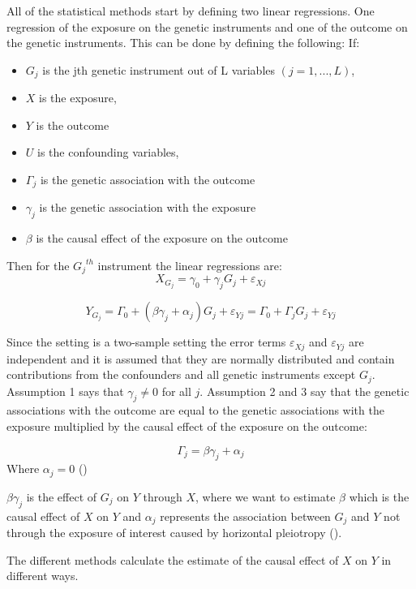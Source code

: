 \documentclass[
]{article}
\providecommand{\tightlist}{%
  \setlength{\itemsep}{0pt}\setlength{\parskip}{0pt}}
\begin{document}
All of the statistical methods start by defining two linear regressions.
One regression of the exposure on the genetic instruments and one of the
outcome on the genetic instruments. This can be done by defining the
following: If:

\begin{itemize}
\tightlist
\item
  \(G_j\) is the jth genetic instrument out of L variables
  \((j=1,...,L)\),
\item
  \(X\) is the exposure,
\item
  \(Y\) is the outcome
\item
  \(U\) is the confounding variables,
\item
  \(\Gamma_j\) is the genetic association with the outcome
\item
  \(\gamma_j\) is the genetic association with the exposure
\item
  \(\beta\) is the causal effect of the exposure on the outcome
\end{itemize}

Then for the \({G_j}^{th}\) instrument the linear regressions are:
\[X_{G_{j}}=\gamma_0+\gamma_jG_j+\varepsilon_{Xj}\tag{1}\]

\[Y_{G_{j}}=\Gamma_0+(\beta\gamma_j+\alpha_j)G_j+\varepsilon_{Yj}=\Gamma_0+\Gamma_jG_j+\varepsilon_{Yj}\tag{2}\]

Since the setting is a two-sample setting the error terms
\(\varepsilon_{Xj}\) and \(\varepsilon_{Yj}\) are independent and it is
assumed that they are normally distributed and contain contributions
from the confounders and all genetic instruments except \(G_j\).
Assumption 1 says that \(\gamma_j\ne 0\) for all \(j\). Assumption 2 and
3 say that the genetic associations with the outcome are equal to the
genetic associations with the exposure multiplied by the causal effect
of the exposure on the outcome:

\[\Gamma_j=\beta\gamma_j+\alpha_j\tag{3}\] Where \(\alpha_j=0\)
()

\(\beta\gamma_j\) is the effect of \(G_j\) on \(Y\) through \(X\), where
we want to estimate \(\beta\) which is the causal effect of \(X\) on
\(Y\) and \(\alpha_j\) represents the association between \(G_j\) and
\(Y\) not through the exposure of interest caused by horizontal
pleiotropy ().

The different methods calculate the estimate of the causal effect of
\(X\) on \(Y\) in different ways.
\end{document}
